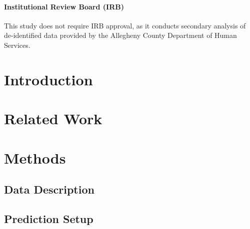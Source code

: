 \documentclass[pmlr,twocolumn,10pt]{jmlr} %
\begin{document}
\paragraph*{Institutional Review Board (IRB)}
This study does not require IRB approval, as it conducts secondary analysis of de-identified data provided by the Allegheny County Department of Human Services.

\setlength{\abovedisplayskip}{3pt plus 1pt}
\setlength{\belowdisplayskip}{3pt plus 1pt}
\setlength{\abovedisplayshortskip}{2pt plus 1pt}
\setlength{\belowdisplayshortskip}{2pt plus 1pt}

\section{Introduction}
\label{sec:intro}


\section{Related Work}
\label{sec:related_works}


\section{Methods}
\label{sec:methods}

\subsection{Data Description}
\label{sec:methods_data}


\subsection{Prediction Setup}
\label{sec:methods_prediction}

\end{document}
